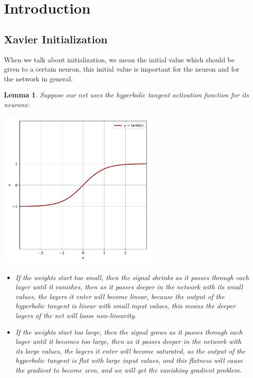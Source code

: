\documentclass[12pt]{article}
\newtheorem{lemma}{Lemma}
\begin{document}
\section{\textbf{Introduction}}\label{sec:introduction}
\subsection{\textbf{Xavier Initialization} \cite{DBLP:journals/jmlr/GlorotB10}}
When we talk about initialization, we mean the initial value which should be given to a certain neuron, this initial value is important for the neuron and for the network in general.\\
\begin{lemma}\label{lemma1}
Suppose our net uses the hyperbolic tangent activation function for its neurons:\\
\begin{center}
	\includegraphics[width=0.6\textwidth]{tanh}\\[1cm]
\end{center}
\begin{itemize}
	\item If the weights start too small, then the signal shrinks as it passes through each layer until it vanishes, then as it passes deeper in the network with its small values, the layers it enter will become linear, because the output of the hyperbolic tangent is linear with small input values, this means the deeper layers of the net will loose non-linearity.
	\item If the weights start too large, then the signal grows as it passes through each layer until it becomes too large, then as it passes deeper in the network with its large values, the layers it enter will become saturated, as the output of the hyperbolic tangent is flat with large input values, and this flatness will cause the gradient to become zero, and we will get the vanishing gradient problem.
\end{itemize}
\end{lemma}
\end{document}
